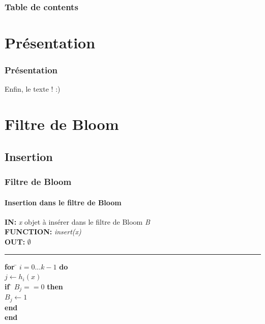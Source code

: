 \documentclass[hyperref={pdfpagemode=FullScreen,colorlinks=true},xcolor=pst,dvips]{beamer}\usepackage[french]{babel}
\title[]{\rule{\linewidth}{1pt}
		\large Recherche de filtres de Bloom similaires \\
		\large Application à la recherche par mots clés basée sur une DHT\\
		\rule{\linewidth}{1pt}
}
\author[NDOMBI TSHISUNGU \& DOAN]{\textbf{NDOMBI TSHISUNGU} Christian \& \textbf{DOAN} Cao Sang \\
			Encadrant: M. \textbf{MAKPANGOU} Mesaac, Regal}
\institute{UPMC}
\date{2 Mai 2015}
\begin{document}
	\begin{frame}
		\titlepage
	\end{frame}
	
	\begin{frame}
		\frametitle{Table de contents}
		\tableofcontents
	\end{frame}
	
	\section{Présentation}
	\begin{frame}
		\frametitle{Présentation}
		Enfin, le texte ! :)
	\end{frame}

	\section{Filtre de Bloom}
	\subsection{Insertion}
	\begin{frame}[shrink]
		\frametitle{Filtre de Bloom}
		\framesubtitle{Insertion dans le filtre de Bloom}
		
		\begin{framed}
		\textbf{IN:} \textit{x} objet à insérer dans le filtre de Bloom \textit{B}\\
		\textbf{FUNCTION:} \textit{insert(x)}\\
		\textbf{OUT:} $\emptyset$
		\noindent\rule{\linewidth}{0.5pt}

		\begin{tabbing}
			\textbf{for} \= $i = 0 ... k - 1$ \textbf{do}\\
					\> $j \leftarrow h_i(x)$\\
					\> \textbf{if} \= $B_j == 0$ \textbf{then}\\
					\> \> $B_j \leftarrow 1$\\
					\> \textbf{end}\\
			\textbf{end}
	    	\end{tabbing}		
	\end{framed}
	\end{frame}
	
\end{document}
